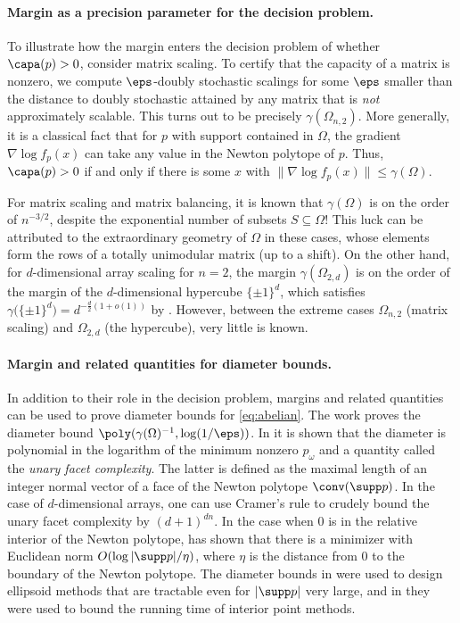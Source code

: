 \paragraph{Margin as a precision parameter for the decision problem.}


To illustrate how the margin enters the decision problem of whether $\capa(p) > 0$, consider matrix scaling.
To certify that the capacity of a matrix is nonzero, we compute $\eps$-doubly stochastic scalings for some $\eps$ smaller than the distance to doubly stochastic attained by any matrix that is \emph{not} approximately scalable. This turns out to be precisely $\gamma(\Omega_{n,2})$. More generally, it is a classical fact that for $p$ with support contained in $\Omega$, the gradient $\nabla \log f_p(x)$ can take any value in the Newton polytope of $p$. Thus, $\capa(p) > 0$ if and only if there is some $x$ with $\|\nabla \log f_p(x)\| \leq \gamma(\Omega)$.

For matrix scaling and matrix balancing, it is known that $\gamma(\Omega)$ is on the order of $n^{-3/2}$, despite the exponential number of subsets $S \subseteq \Omega$! This luck can be attributed to the extraordinary geometry of $\Omega$ in these cases, whose elements form the rows of a totally unimodular matrix (up to a shift).
On the other hand, for $d$-dimensional array scaling for $n = 2$, the margin $\gamma(\Omega_{2,d})$ is on the order of the margin of the $d$-dimensional hypercube $\{\pm 1\}^d$, which satisfies $\gamma \big( \{\pm 1\}^d \big)=d^{-\frac{d}{2}(1 + o(1))}$ by \cite{alon1997anti}.
However, between the extreme cases $\Omega_{n,2}$ (matrix scaling) and $\Omega_{2,d}$ (the hypercube), very little is known.


\paragraph{Margin and related quantities for diameter bounds.}
In addition to their role in the decision problem, margins and related quantities can be used to prove diameter bounds for \cref{eq:abelian}. The work \cite{gradflow} proves the diameter bound $\poly(\gamma(\Omega)^{-1}, \log(1/\eps))$. In \cite{straszak2017computing} it is shown that the diameter is polynomial in the logarithm of the minimum nonzero $p_\omega$ and a quantity called the \emph{unary facet complexity}. The latter is defined as the maximal length of an integer normal vector of a face of the Newton polytope $\conv(\supp p)$. In the case of $d$-dimensional arrays, one can use Cramer's rule to crudely bound the unary facet complexity by $(d + 1)^{dn}$. In the case when $0$ is in the relative interior of the Newton polytope, \cite{singh2014entropy} has shown that there is a minimizer with Euclidean norm $O(\log |\supp p|/\eta)$, where $\eta$ is the distance from $0$ to the boundary of the Newton polytope. The diameter bounds in \cite{singh2014entropy,straszak2017computing} were used to design ellipsoid methods that are tractable even for $|\supp p|$ very large, and in \cite{burgisser2020interior} they were used to bound the running time of interior point methods.

